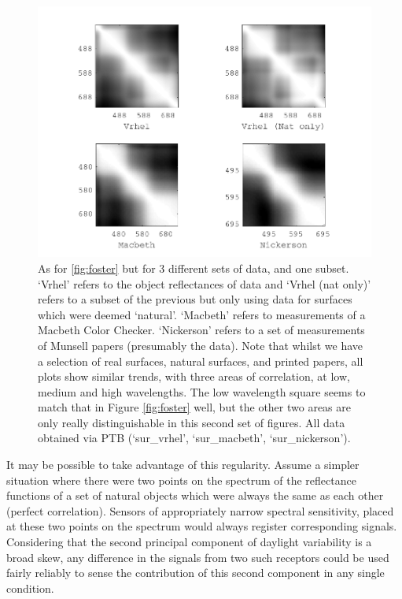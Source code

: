 \begin{figure}[htbp]
 \includegraphics[max width=\textwidth]{figs/comp/nat_cor/others.pdf}
 \caption{As for \ref{fig:foster} but for 3 different sets of data, and one subset. `Vrhel' refers to the object reflectances of \citet{vrhel_measurement_1994} data and `Vrhel (nat only)' refers to a subset of the previous but only using data for surfaces which were deemed `natural'. `Macbeth' refers to measurements of a Macbeth Color Checker. `Nickerson' refers to a set of measurements of Munsell papers (presumably the \citet{kelly_tristimulus_1943} data). Note that whilst we have a selection of real surfaces, natural surfaces, and printed papers, all plots show similar trends, with three areas of correlation, at low, medium and high wavelengths. The low wavelength square seems to match that in Figure \ref{fig:foster} well, but the other two areas are only really distinguishable in this second set of figures. All data obtained via \gls{PTB} (`sur\_vrhel', `sur\_macbeth', `sur\_nickerson').}
 \label{fig:others}
\end{figure} 

It may be possible to take advantage of this regularity. Assume a simpler situation where there were two points on the spectrum of the reflectance functions of a set of natural objects which were always the same as each other (perfect correlation). Sensors of appropriately narrow spectral sensitivity, placed at these two points on the spectrum would always register corresponding signals. Considering that the second principal component of daylight variability is a broad skew, any difference in the signals from two such receptors could be used fairly reliably to sense the contribution of this second component in any single condition. 

